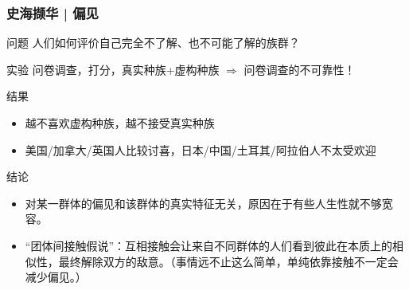 \begin{frame}
  \frametitle{史海撷华 | 偏见}
  \vspace{-0.7em}
  \begin{block}{问题}
    人们如何评价自己完全不了解、也不可能了解的族群？
  \end{block}
  \vspace{-0.7em}
  \pause
  \begin{block}{实验}
    问卷调查，打分，真实种族+虚构种族 $\Longrightarrow$ 问卷调查的不可靠性！
  \end{block}
  \vspace{-0.7em}
  \pause
  \begin{block}{结果}
    \begin{itemize}
      \item 越不喜欢虚构种族，越不接受真实种族
      \item 美国/加拿大/英国人比较讨喜，日本/中国/土耳其/阿拉伯人不太受欢迎
    \end{itemize}
  \end{block}
  \vspace{-0.7em}
  \pause
  \begin{block}{结论}
    \begin{itemize}
      \item 对某一群体的偏见和该群体的真实特征无关，原因在于有些人生性就不够宽容。
      \item “团体间接触假说”：互相接触会让来自不同群体的人们看到彼此在本质上的相似性，最终解除双方的敌意。（事情远不止这么简单，单纯依靠接触不一定会减少偏见。）
    \end{itemize}
  \end{block}
\end{frame}

